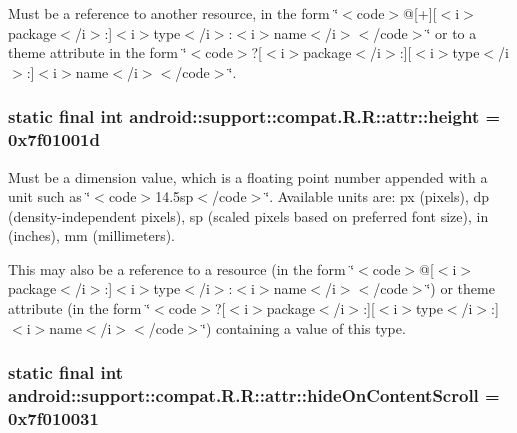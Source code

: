 Must be a reference to another resource, in the form \char`\"{}$<$code$>$@\mbox{[}+\mbox{]}\mbox{[}$<$i$>$package$<$/i$>$:\mbox{]}$<$i$>$type$<$/i$>$:$<$i$>$name$<$/i$>$$<$/code$>$\char`\"{} or to a theme attribute in the form \char`\"{}$<$code$>$?\mbox{[}$<$i$>$package$<$/i$>$:\mbox{]}\mbox{[}$<$i$>$type$<$/i$>$:\mbox{]}$<$i$>$name$<$/i$>$$<$/code$>$\char`\"{}. \hypertarget{classandroid_1_1support_1_1compat_1_1_r_1_1attr_a4b63876401653b09662d5f0229eb5ad}{
\subsubsection[{height}]{\setlength{\rightskip}{0pt plus 5cm}static final int android::support::compat.R.R::attr::height = 0x7f01001d}}
\label{classandroid_1_1support_1_1compat_1_1_r_1_1attr_a4b63876401653b09662d5f0229eb5ad}


Must be a dimension value, which is a floating point number appended with a unit such as \char`\"{}$<$code$>$14.5sp$<$/code$>$\char`\"{}. Available units are: px (pixels), dp (density-independent pixels), sp (scaled pixels based on preferred font size), in (inches), mm (millimeters). 

This may also be a reference to a resource (in the form \char`\"{}$<$code$>$@\mbox{[}$<$i$>$package$<$/i$>$:\mbox{]}$<$i$>$type$<$/i$>$:$<$i$>$name$<$/i$>$$<$/code$>$\char`\"{}) or theme attribute (in the form \char`\"{}$<$code$>$?\mbox{[}$<$i$>$package$<$/i$>$:\mbox{]}\mbox{[}$<$i$>$type$<$/i$>$:\mbox{]}$<$i$>$name$<$/i$>$$<$/code$>$\char`\"{}) containing a value of this type. \hypertarget{classandroid_1_1support_1_1compat_1_1_r_1_1attr_953f6270b6b2c94e03bc52f6be36dc37}{
\subsubsection[{hideOnContentScroll}]{\setlength{\rightskip}{0pt plus 5cm}static final int android::support::compat.R.R::attr::hideOnContentScroll = 0x7f010031}}
\label{classandroid_1_1support_1_1compat_1_1_r_1_1attr_953f6270b6b2c94e03bc52f6be36dc37}


